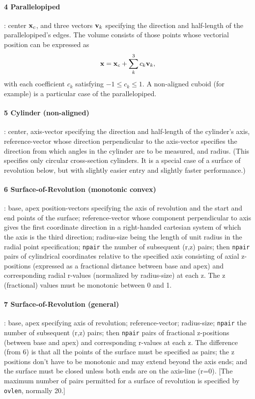 \documentclass[12pt]{article}
\begin{document}
\paragraph{4 Parallelopiped}: center ${\bf x}_c$, and three vectors
${\bf v}_k$ specifying the
direction and half-length of the parallelopiped's edges. The volume
consists of those points whose vectorial position can be expressed as
\begin{equation}\label{parallelocoef}
{\bf x} = {\bf x}_c + \sum_k^3 c_k {\bf v}_k,  
\end{equation}
with each coefficient
$c_k$ satisfying $-1\le c_k \le 1$. A non-aligned cuboid (for example)
is a
particular case of the parallelopiped. 

\paragraph{5 Cylinder (non-aligned)}: center, axis-vector specifying the
direction and half-length of the cylinder's axis, reference-vector
whose direction perpendicular to the axis-vector specifies the
direction from which angles in the cylinder are to be measured, and
radius. (This specifies only circular cross-section cylinders. It is a
special case of a surface of revolution below, but with slightly
easier entry and slightly faster performance.)

\paragraph{6 Surface-of-Revolution (monotonic convex)}: base, apex
position-vectors specifying the axis of revolution and the start and
end points of the surface; reference-vector whose component
perpendicular to axis gives the first coordinate direction in a
right-handed cartesian system of which the axis is the third
direction; radius-size being the length of unit radius in the radial
point specification; \verb!npair! the number of subsequent (r,z)
pairs; then \verb!npair! pairs of cylindrical coordinates relative to
the specified axis consisting of axial z-positions (expressed as a
fractional distance between base and apex) and corresponding radial
r-values (normalized by radius-size) at each z. The z (fractional)
values must be monotonic between 0 and 1.

\paragraph{7 Surface-of-Revolution (general)}: base, apex specifying
axis of revolution; reference-vector; radius-size; \verb!npair! the
number of subsequent (r,z) pairs; then \verb!npair! pairs of
fractional z-positions (between base and apex) and corresponding
r-values at each z. The difference (from 6) is that all the points of the
surface must be specified as pairs; the z positions don't have to be
monotonic and may extend beyond the axis ends; and the surface must be
closed unless both ends are on the axis-line (r=0). [The maximum number
of pairs permitted for a surface of revolution is specified by
\verb!ovlen!, normally 20.]
\end{document}
